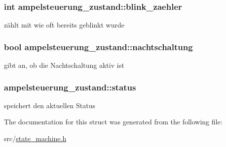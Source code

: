 \subsubsection[{blink\+\_\+zaehler}]{\setlength{\rightskip}{0pt plus 5cm}int ampelsteuerung\+\_\+zustand\+::blink\+\_\+zaehler}\label{structampelsteuerung__zustand_a29020f09e616348272ca1d9679e708f3}


zählt mit wie oft bereits geblinkt wurde 

\hypertarget{structampelsteuerung__zustand_ab6a8a2380b414e129f8799b44e7ae5d5}{}
\subsubsection[{nachtschaltung}]{\setlength{\rightskip}{0pt plus 5cm}bool ampelsteuerung\+\_\+zustand\+::nachtschaltung}\label{structampelsteuerung__zustand_ab6a8a2380b414e129f8799b44e7ae5d5}


gibt an, ob die Nachtschaltung aktiv ist 

\hypertarget{structampelsteuerung__zustand_a7f874ec6002fe3f3f6fcd33f83d402b6}{}
\subsubsection[{status}]{ ampelsteuerung\+\_\+zustand\+::status}\label{structampelsteuerung__zustand_a7f874ec6002fe3f3f6fcd33f83d402b6}


speichert den aktuellen Status 



The documentation for this struct was generated from the following file\+:\begin{DoxyCompactItemize}
\item 
src/\hyperlink{state__machine_8h}{state\+\_\+machine.\+h}\end{DoxyCompactItemize}
